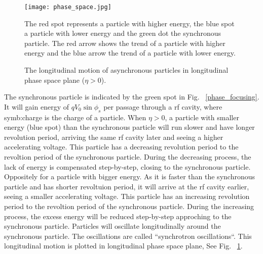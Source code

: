 \begin{figure}[!htb]
   \centering   
   \texttt{[image: phase\_space.jpg]}
   \caption{The longitudinal motion of asynchronous particles in longitudinal phase space plane ($\eta > 0$).}{The red spot represents a particle with higher energy, the blue spot a particle with lower energy and the green dot the synchronous particle. The red arrow shows the trend of a particle with higher energy and the blue arrow the trend of a particle with lower energy.}
   \label{phase_space}
\end{figure}
The synchronous particle is indicated by the green spot in Fig. ~\ref{phase_focusing}. It will gain energy of $qV_0\sin\phi_{\mathit{s}}$ per passage through a rf cavity, where \gls{symb:charge} is the charge of a particle.  When $\eta > 0$, a particle with smaller energy (blue spot) than the synchronous particle will run slower and have longer revolution period, arriving the same rf cavity later and seeing a higher accelerating voltage. This particle has a decreasing revolution period to the revoltion period of the synchronous particle. During the decreasing process, the lack of energy is compensated step-by-step, closing to the synchronous particle. Oppositely for a particle with bigger energy. As it is faster than the synchronous particle and has shorter revoltuion period, it will arrive at the rf cavity earlier, seeing a smaller accelerating voltage. This particle has an increasing revolution period to the revoltion period of the synchronous particle. During the increasing process, the excess energy will be reduced step-by-step approching to the synchronous particle. Particles will oscillate longitudinally around the synchronous particle. The oscillations are called ``synchrotron oscillations``. This longitudinal motion is plotted in longitudinal phase space plane, See Fig. ~\ref{phase_space}.

